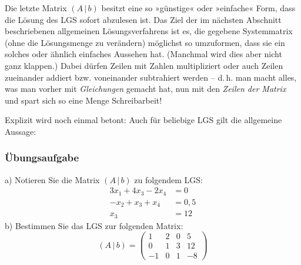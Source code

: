 Die letzte Matrix $(A\,|\,b)$ besitzt eine so »günstige« oder »einfache« Form, dass die Lösung des LGS sofort abzulesen ist. Das Ziel der im nächsten Abschnitt beschriebenen allgemeinen Lösungsverfahrens ist es, die gegebene Systemmatrix (ohne die Lösungsmenge zu verändern) möglichst so umzuformen, dass sie ein solches oder ähnlich einfaches Aussehen hat. (Manchmal wird dies aber nicht ganz klappen.) Dabei dürfen Zeilen mit Zahlen multipliziert oder auch Zeilen zueinander addiert bzw. voneinander subtrahiert werden -- d.\,h. man macht alles, was man vorher mit \emph{Gleichungen} gemacht hat, nun mit den \emph{Zeilen der Matrix} und spart sich so eine Menge Schreibarbeit!

Explizit wird noch einmal betont: Auch für beliebige LGS gilt die allgemeine Aussage:

\subsubsection{Übungsaufgabe}

\begin{graukasten}
  a) Notieren Sie die Matrix $(A\,|\,b)$ zu folgendem LGS:
  \begin{align*}
    3x_1 + 4x_3 - 2x_4 &= 0\\
    -x_2 + x_3 + x_4 &= 0{,}5\\
    x_3 &= 12
  \end{align*}
  b) Bestimmen Sie das LGS zur folgenden Matrix:
  \[ (A\,|\,b) = \left(\begin{array}{ccc|c} 1 & 2 & 0 & 5\\ 0 & 1 & 3 & 12\\ -1 & 0 & 1 & -8 \end{array}\right) \]
\end{graukasten}
